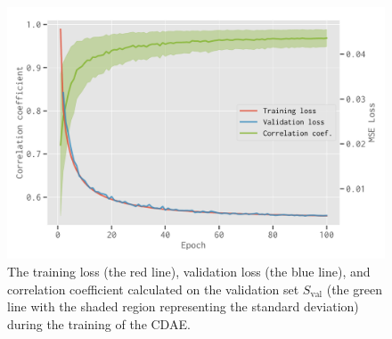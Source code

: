 \documentclass[letters,a4paper,fleqn,usenatbib]{mnras}
\newcommand{\R}[1]{\mathrm{#1}}
\begin{document}
\begin{figure}
  \centering
  \includegraphics[width=\columnwidth]{cdae-train}
  \caption{\label{fig:train}%
    The training loss (the red line), validation loss (the blue line),
    and correlation coefficient calculated on the validation set
    $S_{\R{val}}$ (the green line with the shaded region representing
    the standard deviation) during the training of the CDAE.
  }
\end{figure}
\end{document}
